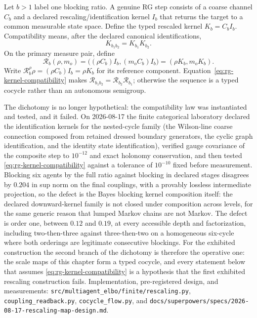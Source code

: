 Let $b>1$ label one blocking ratio.  A genuine RG step consists of a coarse
channel $C_b$ and a declared rescaling/identification kernel $I_b$ that returns
the target to a common measurable state space.  Define the typed rescaled
kernel $K_b=C_bI_b$.  Compatibility means, after the declared canonical
identifications,
\begin{equation}
K_{b_1b_2}=K_{b_1}K_{b_2}.
\label{eq:rg-kernel-compatibility}
\end{equation}
On the primary measure pair,
define
\begin{equation}
\mathcal R_b(\rho,m_o)
=\bigl((\rho C_b)I_b,(m_oC_b)I_b\bigr)
=(\rho K_b,m_oK_b).
\label{eq:rg-measure-pair-map}
\end{equation}
Write $\mathcal R_b^\rho\rho=(\rho C_b)I_b=\rho K_b$ for its reference
component.
Equation~\eqref{eq:rg-kernel-compatibility} makes
$\mathcal R_{b_1b_2}=\mathcal R_{b_2}\mathcal R_{b_1}$; otherwise the sequence
is a typed cocycle rather than an autonomous semigroup.  

The dichotomy is no longer hypothetical: the compatibility law was
instantiated and tested, and it failed.  On 2026-08-17 the finite categorical
laboratory declared the identification kernels for the nested-cycle family
(the Wilson-line coarse connection composed from retained dressed boundary
generators, the cyclic graph identification, and the identity state
identification), verified gauge covariance of the composite step to $10^{-12}$
and exact holonomy conservation, and then tested
\eqref{eq:rg-kernel-compatibility} against a tolerance of $10^{-10}$ fixed
before measurement.  Blocking six agents by the full ratio against blocking in
declared stages disagrees by $0.204$ in sup norm on the final couplings, with
a provably lossless intermediate projection, so the defect is the Bayes
blocking kernel composition itself: the declared downward-kernel family is not
closed under composition across levels, for the same generic reason that
lumped Markov chains are not Markov.  The defect is order one, between $0.12$
and $0.19$, at every accessible depth and factorization, including
two-then-three against three-then-two on a homogeneous six-cycle where both
orderings are legitimate consecutive blockings.  For the exhibited
construction the second branch of the dichotomy is therefore the operative
one: the scale maps of this chapter form a typed cocycle, and every statement
below that assumes \eqref{eq:rg-kernel-compatibility} is a hypothesis that the
first exhibited rescaling construction fails.  Implementation, pre-registered
design, and measurements:
\texttt{src/multiagent\_elbo/finite/rescaling.py},
\texttt{coupling\_readback.py}, \texttt{cocycle\_flow.py}, and
\texttt{docs/superpowers/specs/2026-08-17-rescaling-map-design.md}.

